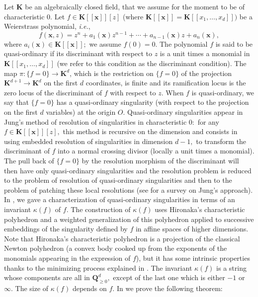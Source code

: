 \documentclass[11pt, a4paper]{amsart}
\numberwithin{equation}{section}
\theoremstyle{plain}
\theoremstyle{definition}
\theoremstyle{remark}
\newcommand{\K}{\mathbf{K}}
\newcommand{\0}{{\boldsymbol 0}}
\newcommand{\x}{{\boldsymbol x}}
\begin{document}
\noindent Let $\K$ be an algebraically closed field, that we assume for the moment to be of characteristic $0.$ Let $f\in \K[[\x]][z]$ (where $\K[[\x]]=\K[[x_1,\ldots,x_d]])$ be a Weierstrass polynomial, \textit{i.e.},
\[f(\x,z)=z^n+a_1(\x)z^{n-1}+\cdots + a_{n-1}(\x)z+a_{n}(\x),\]
where $a_i(\x) \in \K[[\x]];$ we assume $f(0)=0.$ The polynomial $f$ is said to be quasi-ordinary if its discriminant with respect to $z$ is a unit times a monomial in $\textbf{K}[[x_1,\ldots,x_d]]$ (we refer to this condition as the discriminant condition). The map 
$\pi:\{f=0\}\longrightarrow\textbf{K}^d$, which is the restriction on $\{f=0\}$ of the projection  $\K^{d+1}\longrightarrow\textbf{K}^d$ on the first $d$ coordinates, is finite and  its ramification locus is the zero locus of the discriminant of $f$ with respect to $z.$ When $f$ is quasi-ordinary, we say that $\{f=0\}$ has a quasi-ordinary singularity (with respect to the projection on the first $d$ variables) at the origin $O.$ Quasi-ordinary singularities appear in  Jung's method of resolution of singularities in characteristic $0:$ for any $f\in \textbf{K}[[\x]][z],$ this method is recursive on the dimension and consists in using embedded resolution of singularities in dimension $d-1,$ to transform the discriminant of $f$  into a normal crossing divisor (locally a unit times a monomial). The pull back of  $\{f=0\}$ by the resolution morphism of the discriminant  will then have only quasi-ordinary singularities and the resolution problem is  reduced to the problem of resolution of quasi-ordinary singularities and then to the problem of patching these local resolutions (see \cite{PP} for a survey on Jung's approach).\\

In \cite{MS}, we gave a characterization of quasi-ordinary singularities in terms of an invariant $\kappa(f)$ of $f.$  The construction of $\kappa(f)$ uses Hironaka's characteristic polyhedron and a weighted generalization of this polyhedron applied to successive embeddings of the singularity defined by $f$ in affine spaces of higher dimensions. Note that Hironaka's characteristic polyhedron is a projection of the classical Newton polyhedron (a convex body cooked up from the exponents of the monomials appearing in the expression of $f$), but it has some intrinsic properties thanks to the minimizing process explained in \cite{MS}. The invariant $\kappa(f)$ is a string whose components are all in $\textbf{Q}_{\geq 0}^d,$ except of the last one which is either $-1$ or $\infty.$ The size of $\kappa(f)$ depends on $f.$ In \cite{MS} we prove the following theorem:\\
\end{document}

